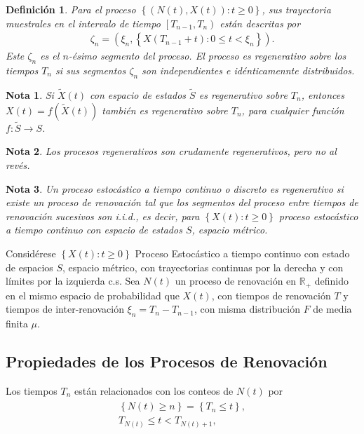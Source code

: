 \documentclass{article}
\newtheorem{Def}{Definición}[section]
\newtheorem{Note}{Nota}[section]
\newcommand{\rea}{\mathbb{R}}
\numberwithin{equation}{section}
\begin{document}
\begin{Def}
Para el proceso $\left\{\left(N\left(t\right),X\left(t\right)\right):t\geq0\right\}$, sus trayectoria muestrales en el intervalo de tiempo $\left[T_{n-1},T_{n}\right)$ est\'an descritas por
\begin{eqnarray*}
\zeta_{n}=\left(\xi_{n},\left\{X\left(T_{n-1}+t\right):0\leq t<\xi_{n}\right\}\right).
\end{eqnarray*}
Este $\zeta_{n}$ es el $n$-\'esimo segmento del proceso. El proceso es regenerativo sobre los tiempos $T_{n}$ si sus segmentos $\zeta_{n}$ son independientes e id\'enticamennte distribuidos.
\end{Def}


\begin{Note}
Si $\tilde{X}\left(t\right)$ con espacio de estados $\tilde{S}$ es regenerativo sobre $T_{n}$, entonces $X\left(t\right)=f\left(\tilde{X}\left(t\right)\right)$ tambi\'en es regenerativo sobre $T_{n}$, para cualquier funci\'on $f:\tilde{S}\rightarrow S$.
\end{Note}

\begin{Note}
Los procesos regenerativos son crudamente regenerativos, pero no al rev\'es.
\end{Note}


\begin{Note}
Un proceso estoc\'astico a tiempo continuo o discreto es regenerativo si existe un proceso de renovaci\'on  tal que los segmentos del proceso entre tiempos de renovaci\'on sucesivos son i.i.d., es decir, para $\left\{X\left(t\right):t\geq0\right\}$ proceso estoc\'astico a tiempo continuo con espacio de estados $S$, espacio m\'etrico.
\end{Note}

Consid\'erese $\left\{X\left(t\right):t\geq0\right\}$ Proceso Estoc\'astico a tiempo continuo con estado de espacios $S$, espacio m\'etrico, con trayectorias continuas por la derecha y con l\'imites por la izquierda c.s. Sea $N\left(t\right)$ un proceso de renovaci\'on en $\rea_{+}$ definido en el mismo espacio de probabilidad que $X\left(t\right)$, con tiempos de renovaci\'on $T$ y tiempos de inter-renovaci\'on $\xi_{n}=T_{n}-T_{n-1}$, con misma distribuci\'on $F$ de media finita $\mu$.



\subsection*{Propiedades de los Procesos de Renovaci\'on}
Los tiempos $T_{n}$ est\'an relacionados con los conteos de $N\left(t\right)$ por
\begin{eqnarray}
\begin{array}{l}
\left\{N\left(t\right)\geq n\right\}=\left\{T_{n}\leq t\right\},\\
T_{N\left(t\right)}\leq t<T_{N\left(t\right)+1},
\end{array}
\end{eqnarray}
\end{document}
